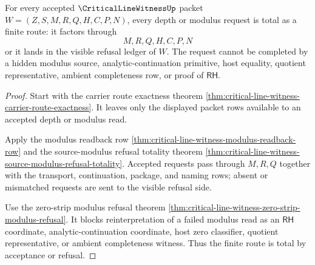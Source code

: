 \begin{theorem}
\label{thm:critical-line-witness-modulus-route-totality}
For every accepted $\CriticalLineWitnessUp$ packet $W=(Z,S,M,R,Q,H,C,P,N)$, every depth or modulus request is total as a finite route: it factors through
$$
M,R,Q,H,C,P,N
$$
or it lands in the visible refusal ledger of $W$. The request cannot be completed by a hidden modulus source, analytic-continuation primitive, host equality, quotient representative, ambient completeness row, or proof of $\mathsf{RH}$.
\end{theorem}
\begin{proof}
Start with the carrier route exactness theorem \autoref{thm:critical-line-witness-carrier-route-exactness}. It leaves only the displayed packet rows available to an accepted depth or modulus read.

Apply the modulus readback row \autoref{thm:critical-line-witness-modulus-readback-row} and the source-modulus refusal totality theorem \autoref{thm:critical-line-witness-source-modulus-refusal-totality}. Accepted requests pass through $M,R,Q$ together with the transport, continuation, package, and naming rows; absent or mismatched requests are sent to the visible refusal side.

Use the zero-strip modulus refusal theorem \autoref{thm:critical-line-witness-zero-strip-modulus-refusal}. It blocks reinterpretation of a failed modulus read as an $\mathsf{RH}$ coordinate, analytic-continuation coordinate, host zero classifier, quotient representative, or ambient completeness witness. Thus the finite route is total by acceptance or refusal.
\end{proof}

